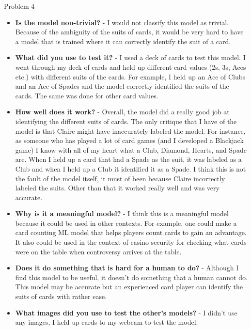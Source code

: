 \begin{problem}{Problem 4}
\begin{highlight}[Solution]
        \begin{itemize}
            \item \textbf{Is the model non-trivial?} - I would not classify this model as trivial. Because of the ambiguity of the suits of cards, it would be very hard to have a model that is 
            trained where it can correctly identify the suit of a card.
            \item \textbf{What did you use to test it?} - I used a deck of cards to test this model. I went through my deck of cards and held up different card values (2s, 3s, Aces etc.) with
            different suits of the cards. For example, I held up an Ace of Clubs and an Ace of Spades and the model correctly identified the suits of the cards. The same was done for other card
            values.
            \item \textbf{How well does it work?} - Overall, the model did a really good job at identifying the different suits of cards. The only critique that I have of the model is that Claire
            might have inaccurately labeled the model. For instance, as someone who has played a lot of card games (and I developed a Blackjack game) I know with all of my heart what a Club, Diamond,
            Hearts, and Spade are. When I held up a card that had a Spade as the suit, it was labeled as a Club and when I held up a Club it identified it as a Spade. I think this is not the fault of
            the model itself, it must of been because Claire incorrectly labeled the suits. Other than that it worked really well and was very accurate.
            \item \textbf{Why is it a meaningful model?} - I think this is a meaningful model because it could be used in other contexts. For example, one could make a card counting ML model that
            helps players count cards to gain an advantage. It also could be used in the context of casino security for checking what cards were on the table when controversy arrives at the table.
            \item \textbf{Does it do something that is hard for a human to do?} - Although I find this model to be useful, it doesn't do something that a human cannot do. This model may be accurate
            but an experienced card player can identify the suits of cards with rather ease.
            \item \textbf{What images did you use to test the other's models?} - I didn't use any images, I held up cards to my webcam to test the model.
        \end{itemize}
    \end{highlight}


\end{problem}
